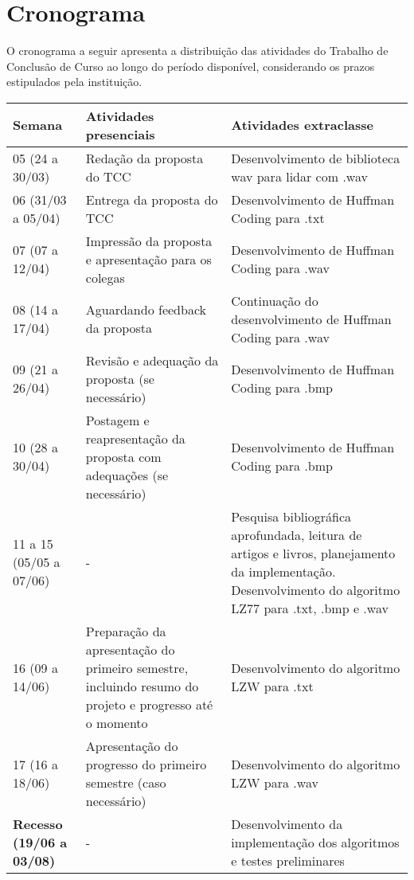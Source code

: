 \chapter{Cronograma}
\label{c.cronograma}

O cronograma a seguir apresenta a distribuição das atividades do Trabalho de Conclusão de Curso ao longo do período disponível, considerando os prazos estipulados pela instituição.

\begin{table}[htb]
    \centering
    \renewcommand{\arraystretch}{1.3}
    \begin{tabular}{|p{4cm}|p{5cm}|p{5cm}|}
        \hline
        \textbf{Semana} & \textbf{Atividades presenciais} & \textbf{Atividades extraclasse} \\
        \hline
        05 (24 a 30/03) & Redação da proposta do TCC & Desenvolvimento de biblioteca wav para lidar com .wav \\
        \hline
        06 (31/03 a 05/04) & Entrega da proposta do TCC & Desenvolvimento de Huffman Coding para .txt \\
        \hline
        07 (07 a 12/04) & Impressão da proposta e apresentação para os colegas & Desenvolvimento de Huffman Coding para .wav \\
        \hline
        08 (14 a 17/04) & Aguardando feedback da proposta & Continuação do desenvolvimento de Huffman Coding para .wav \\
        \hline
        09 (21 a 26/04) & Revisão e adequação da proposta (se necessário) & Desenvolvimento de Huffman Coding para .bmp \\
        \hline
        10 (28 a 30/04) & Postagem e reapresentação da proposta com adequações (se necessário) & Desenvolvimento de
        Huffman Coding para .bmp \\
        \hline
        11 a 15 (05/05 a 07/06) & - & Pesquisa bibliográfica aprofundada, leitura de artigos e livros, planejamento da
        implementação. Desenvolvimento do algoritmo LZ77 para .txt, .bmp e .wav \\
        \hline
        16 (09 a 14/06) & Preparação da apresentação do primeiro semestre, incluindo resumo do projeto e progresso até o momento & Desenvolvimento do algoritmo LZW para .txt \\
        \hline
        17 (16 a 18/06) & Apresentação do progresso do primeiro semestre (caso necessário) & Desenvolvimento do algoritmo LZW para .wav \\
        \hline
        \textbf{Recesso (19/06 a 03/08)} & - & Desenvolvimento da implementação dos algoritmos e testes preliminares

\end{tabular}
\end{table}
